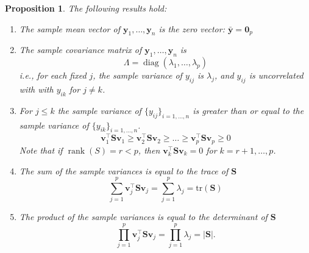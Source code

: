 \documentclass[]{book}
\newtheorem{proposition}{Proposition}[chapter]
\theoremstyle{definition}
\theoremstyle{definition}
\theoremstyle{definition}
\theoremstyle{remark}
\begin{document}
\begin{proposition}
\protect\hypertarget{prp:pca2}{}{\label{prp:pca2} }The following results hold:

\begin{enumerate}
\def\labelenumi{\arabic{enumi}.}
\item
  The sample mean vector of \(\mathbf y_1, \ldots , \mathbf y_n\) is the zero vector: \(\bar{\mathbf y}={\mathbf 0}_p\)
\item
  The sample covariance matrix of \(\mathbf y_1, \ldots, \mathbf y_n\) is
  \[\Lambda = \operatorname{diag}(\lambda_1, \ldots, \lambda_p)\]
  i.e., for each fixed \(j\), the sample variance of \(y_{ij}\) is \(\lambda_j\), and \(y_{ij}\) is uncorrelated with with \(y_{ik}\) for \(j\not = k\).
\item
  For \(j\leq k\) the sample variance of \(\{y_{ij}\}_{i=1, \ldots , n}\) is greater than or equal to the sample variance of \(\{y_{ik}\}_{i=1, \ldots , n}\).
  \[\mathbf v_1^\top \mathbf S\mathbf v_1 \geq \mathbf v_2^\top \mathbf S\mathbf v_2 \geq \ldots \geq \mathbf v_p^\top \mathbf S\mathbf v_p\geq 0\]
  Note that if \(\operatorname{rank}(S)=r<p\), then \(\mathbf v_k^\top \mathbf S\mathbf v_k = 0\) for \(k=r+1, \ldots, p\).
\item
  The sum of the sample variances is equal to the trace of \(\mathbf S\)
  \[\sum_{j=1}^p \mathbf v_j^\top \mathbf S\mathbf v_j = \sum_{j=1}^p \lambda_j = \text{tr}(\mathbf S)\]
\item
  The product of the sample variances is equal to the determinant of \(\mathbf S\)
  \[\prod_{j=1}^p \mathbf v_j^\top \mathbf S\mathbf v_j = \prod_{j=1}^p \lambda_j = |\mathbf S|.\]
\end{enumerate}
\end{proposition}
\end{document}
